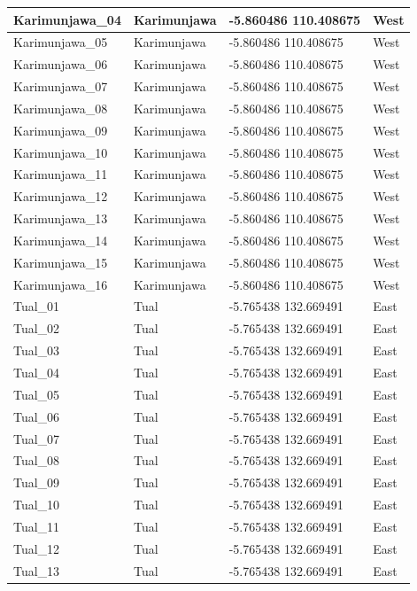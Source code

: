 \documentclass[
]{article}
\begin{document}
\begin{table}
\begin{tabular}{l|l|l|l}
\hline
Karimunjawa\_04 & Karimunjawa & -5.860486 110.408675 & West\\
\hline
Karimunjawa\_05 & Karimunjawa & -5.860486 110.408675 & West\\
\hline
Karimunjawa\_06 & Karimunjawa & -5.860486 110.408675 & West\\
\hline
Karimunjawa\_07 & Karimunjawa & -5.860486 110.408675 & West\\
\hline
Karimunjawa\_08 & Karimunjawa & -5.860486 110.408675 & West\\
\hline
Karimunjawa\_09 & Karimunjawa & -5.860486 110.408675 & West\\
\hline
Karimunjawa\_10 & Karimunjawa & -5.860486 110.408675 & West\\
\hline
Karimunjawa\_11 & Karimunjawa & -5.860486 110.408675 & West\\
\hline
Karimunjawa\_12 & Karimunjawa & -5.860486 110.408675 & West\\
\hline
Karimunjawa\_13 & Karimunjawa & -5.860486 110.408675 & West\\
\hline
Karimunjawa\_14 & Karimunjawa & -5.860486 110.408675 & West\\
\hline
Karimunjawa\_15 & Karimunjawa & -5.860486 110.408675 & West\\
\hline
Karimunjawa\_16 & Karimunjawa & -5.860486 110.408675 & West\\
\hline
Tual\_01 & Tual & -5.765438 132.669491 & East\\
\hline
Tual\_02 & Tual & -5.765438 132.669491 & East\\
\hline
Tual\_03 & Tual & -5.765438 132.669491 & East\\
\hline
Tual\_04 & Tual & -5.765438 132.669491 & East\\
\hline
Tual\_05 & Tual & -5.765438 132.669491 & East\\
\hline
Tual\_06 & Tual & -5.765438 132.669491 & East\\
\hline
Tual\_07 & Tual & -5.765438 132.669491 & East\\
\hline
Tual\_08 & Tual & -5.765438 132.669491 & East\\
\hline
Tual\_09 & Tual & -5.765438 132.669491 & East\\
\hline
Tual\_10 & Tual & -5.765438 132.669491 & East\\
\hline
Tual\_11 & Tual & -5.765438 132.669491 & East\\
\hline
Tual\_12 & Tual & -5.765438 132.669491 & East\\
\hline
Tual\_13 & Tual & -5.765438 132.669491 & East\\

\end{tabular}
\end{table}
\end{document}
